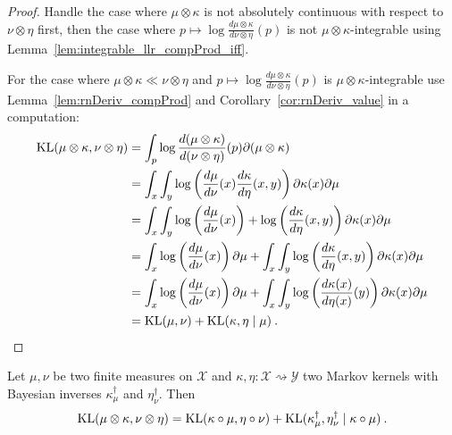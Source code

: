 \begin{proof} \leanok
{}
Handle the case where $\mu \otimes \kappa$ is not absolutely continuous with respect to  $\nu \otimes \eta$ first, then the case where $p \mapsto \log \frac{d \mu \otimes \kappa}{d \nu \otimes \eta}(p)$ is not $\mu \otimes \kappa$-integrable using Lemma~\ref{lem:integrable_llr_compProd_iff}.

For the case where $\mu \otimes \kappa \ll \nu \otimes \eta$ and $p \mapsto \log \frac{d \mu \otimes \kappa}{d \nu \otimes \eta}(p)$ is $\mu \otimes \kappa$-integrable use Lemma~\ref{lem:rnDeriv_compProd} and Corollary~\ref{cor:rnDeriv_value} in a computation:
\begin{align*}
\operatorname{KL}(\mu \otimes \kappa, \nu \otimes \eta)
&= \int_p \log \frac{d(\mu \otimes \kappa)}{d(\nu \otimes \eta)}(p) \partial (\mu \otimes \kappa)
\\
&= \int_x \int_y\log \left(\frac{d\mu}{d \nu}(x)\frac{d\kappa}{d \eta}(x,y)\right) \partial \kappa(x) \partial\mu
\\
&= \int_x \int_y\log \left(\frac{d\mu}{d \nu}(x)\right) + \log \left(\frac{d\kappa}{d \eta}(x,y)\right) \partial \kappa(x) \partial\mu
\\
&= \int_x \log \left(\frac{d\mu}{d \nu}(x)\right)\partial\mu + \int_x \int_y\log \left(\frac{d\kappa}{d \eta}(x,y)\right) \partial \kappa(x) \partial\mu
\\
&= \int_x \log \left(\frac{d\mu}{d \nu}(x)\right)\partial\mu + \int_x \int_y\log \left(\frac{d\kappa(x)}{d \eta(x)}(y)\right) \partial \kappa(x) \partial\mu
\\
&= \operatorname{KL}(\mu, \nu) + \operatorname{KL}(\kappa, \eta \mid \mu)
\: .
\end{align*}

\end{proof}


\begin{theorem}
  \label{thm:kl_compProd_bayesInv}
  Let $\mu, \nu$ be two finite measures on $\mathcal X$ and $\kappa, \eta : \mathcal X \rightsquigarrow \mathcal Y$ two Markov kernels with Bayesian inverses $\kappa_\mu^\dagger$ and $\eta_\nu^\dagger$.
  Then 
  \begin{align*}
  \operatorname{KL}(\mu \otimes \kappa, \nu \otimes \eta) = \operatorname{KL}(\kappa \circ \mu, \eta \circ \nu) + \operatorname{KL}(\kappa_\mu^\dagger, \eta_\nu^\dagger \mid \kappa \circ \mu)
  \: .
  \end{align*}
\end{theorem}

